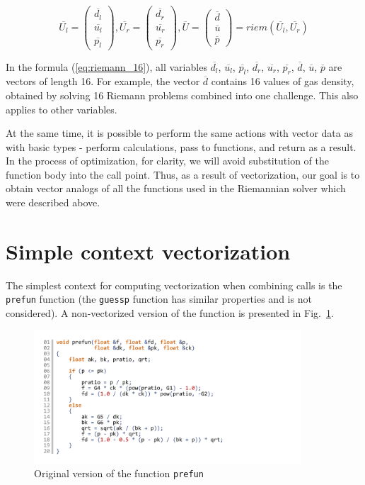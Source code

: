 \documentclass[utf8,english]{psta}%
\begin{document}
\begin{equation}\label{eq:riemann_16}
\overline{U_l} = \left( \begin{array}{ccc} \overline{d_l} \\ \overline{u_l} \\ \overline{p_l} \end{array} \right),
\overline{U_r} = \left( \begin{array}{ccc} \overline{d_r} \\ \overline{u_r} \\ \overline{p_r} \end{array} \right),
\overline{U} = \left( \begin{array}{ccc} \overline{d} \\ \overline{u} \\ \overline{p} \end{array} \right) = riem(\overline{U_l}, \overline{U_r})
\end{equation}

In the formula (\ref{eq:riemann_16}), all variables $\overline{d_l}$, $\overline{u_l}$, $\overline{p_l}$, $\overline{d_r}$, $\overline{u_r}$, $\overline{p_r}$, $\overline{d}$, $\overline{u}$, $\overline{p}$ are vectors of length 16.
For example, the vector $\overline{d}$ contains 16 values of gas density, obtained by solving 16 Riemann problems combined into one challenge.
This also applies to other variables.

At the same time, it is possible to perform the same actions with vector data as with basic types - perform calculations, pass to functions, and return as a result.
In the process of optimization, for clarity, we will avoid substitution of the function body into the call point.
Thus, as a result of vectorization, our goal is to obtain vector analogs of all the functions used in the Riemannian solver which were described above.

\section{Simple context vectorization}

The simplest context for computing vectorization when combining calls is the \texttt{prefun} function (the \texttt{guessp} function has similar properties and is not considered).
A non-vectorized version of the function is presented in Fig.~\ref{pic:prefun_code}.

\begin{figure}
\includegraphics[width=10cm]{pics/pic_prefun_code}
\caption{Original version of the function \texttt{prefun}}
\label{pic:prefun_code}
\end{figure}
\end{document}
